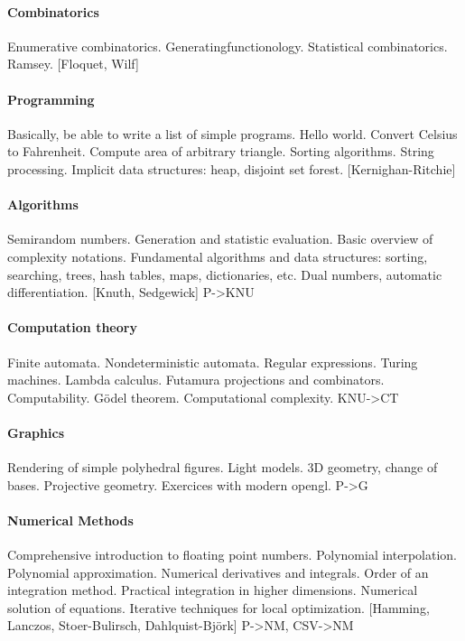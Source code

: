 \paragraph{Combinatorics}
Enumerative combinatorics.
Generatingfunctionology.
Statistical combinatorics.  Ramsey.
[Floquet, Wilf]


\paragraph{Programming}
Basically, be able to write a list of simple programs.
Hello world.  Convert Celsius to Fahrenheit.
Compute area of arbitrary triangle.
Sorting algorithms.  String processing.
Implicit data structures: heap, disjoint set forest.
[Kernighan-Ritchie]
{}

\paragraph{Algorithms}
Semirandom numbers.  Generation and statistic evaluation.
Basic overview of complexity notations.
Fundamental algorithms and data structures: sorting, searching, trees, hash
tables, maps, dictionaries, etc.
Dual numbers, automatic differentiation.
[Knuth, Sedgewick]
{P->KNU}

\paragraph{Computation theory}
Finite automata. Nondeterministic automata. Regular expressions.
Turing machines.  Lambda calculus.  Futamura projections and combinators.
Computability.  Gödel theorem.
Computational complexity.
{KNU->CT}

\paragraph{Graphics}
Rendering of simple polyhedral figures.  Light models.
3D geometry, change of bases.  Projective geometry.
Exercices with modern opengl.
{P->G}

\paragraph{Numerical Methods}
Comprehensive introduction to floating point numbers.
Polynomial interpolation.
Polynomial approximation.
Numerical derivatives and integrals.
Order of an integration method.
Practical integration in higher dimensions.
Numerical solution of equations.
Iterative techniques for local optimization.
[Hamming, Lanczos, Stoer-Bulirsch, Dahlquist-Björk]
{P->NM, CSV->NM}

